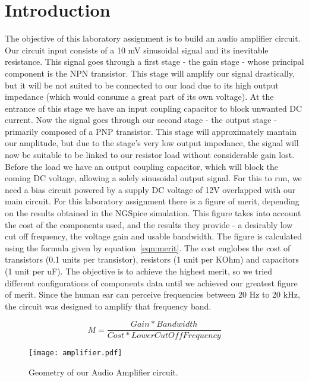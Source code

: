 \section{Introduction}
\label{sec:introduction}
The objective of this laboratory assignment is to build an audio amplifier circuit.
Our circuit input consists of a 10 mV sinusoidal signal and its inevitable resistance. This signal goes through a first stage - the gain stage - whose principal component is the NPN transistor. This stage will amplify our signal drastically, but it will be not suited to be connected to our load due to its high output impedance (which would consume a great part of its own voltage). At the entrance of this stage we have an input coupling capacitor to block unwanted DC current. Now the signal goes through our second stage - the output stage - primarily composed of a PNP transistor. This stage will approximately mantain our amplitude, but due to the stage's very low output impedance, the signal will now be suitable to be linked to our resistor load without considerable gain lost. Before the load we have an output coupling capacitor, which will block the coming DC voltage, allowing a solely sinusoidal output signal. For this to run, we need a bias circuit powered by a supply DC voltage of 12V overlapped with our main circuit. 
For this laboratory assignment there is a figure of merit, depending on the results obtained in the NGSpice simulation. This figure takes into account the cost of the components used, and the results they provide - a desirably low cut off frequency, the voltage gain and usable bandwidth. The figure is calculated using the formula given by equation~\ref{eqn:merit}. The cost englobes the cost of transistors (0.1 units per transistor), resistors (1 unit per KOhm) and capacitors (1 unit per uF). The objective is to achieve the highest merit, so we tried different configurations of components data until we achieved our greatest figure of merit.
Since the human ear can perceive frequencies between 20 Hz to 20 kHz, the circuit was designed to amplify that frequency band.

\begin{equation}
\label{eqn:merit}
M=\frac{Gain*Bandwidth}{Cost*LowerCutOffFrequency}
\end{equation}

\begin{figure}[h] \centering
\texttt{[image: amplifier.pdf]}
\caption{Geometry of our Audio Amplifier circuit.}
\end{figure}

